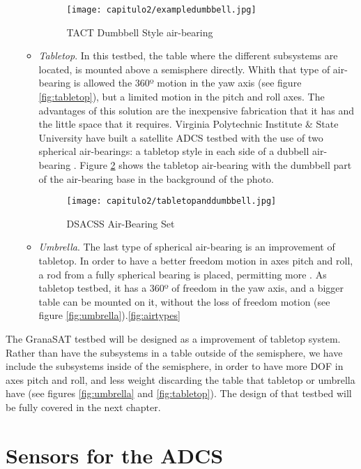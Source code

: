 \begin{itemize}
\begin{itemize}
\begin{figure}[H]
	\centering
		\texttt{[image: capitulo2/exampledumbbell.jpg]}
	\caption{TACT Dumbbell Style air-bearing \cite{michigantestbed}}
	\label{fig:exampledumbbell}
\end{figure}

\item \textit{Tabletop}. In this testbed, the table where the different subsystems are located, is mounted above a semisphere directly. Whith that type of air-bearing is allowed the 360º motion in the yaw axis (see figure \ref{fig:tabletop}), but a limited motion in the pitch and roll axes. The advantages of this solution are the inexpensive fabrication that it has and the little space that it requires. Virginia Polytechnic Institute & State University have built a satellite \acrshort{ADCS} testbed with the use of two spherical air-bearings: a tabletop style in each side of a dubbell air-bearing \cite{virginia}. Figure \ref{fig:tabledumd} shows the tabletop
air-bearing with the dumbbell part of the air-bearing base in the background of the photo.

\begin{figure}[H]
	\centering
		\texttt{[image: capitulo2/tabletopanddumbbell.jpg]}
	\caption{DSACSS Air-Bearing Set \cite{virginia}}
	\label{fig:tabledumd}
\end{figure}

\item \textit{Umbrella}. The last type of spherical air-bearing is an improvement of tabletop. In order to have a better freedom motion in axes pitch and roll, a rod from a fully spherical bearing is placed, permitting more . As tabletop testbed, it has a 360º of freedom in the yaw axis, and a bigger table can be mounted on it, without the loss of freedom motion (see figure \ref{fig:umbrella}).\ref{fig:airtypes}
\end{itemize}
\end{itemize}

The \gls{GranaSAT} testbed will be designed as a improvement of tabletop system. Rather than have the subsystems in a table outside of the semisphere, we have include the subsystems inside of the semisphere, in order to have more \acrshort{DOF} in axes pitch and roll, and less weight discarding the table that tabletop or umbrella have (see figures \ref{fig:umbrella} and \ref{fig:tabletop}). The design of that testbed will be fully covered in the next chapter.  


\section{Sensors for the \acrshort{ADCS}}\label{sec:sensors}

